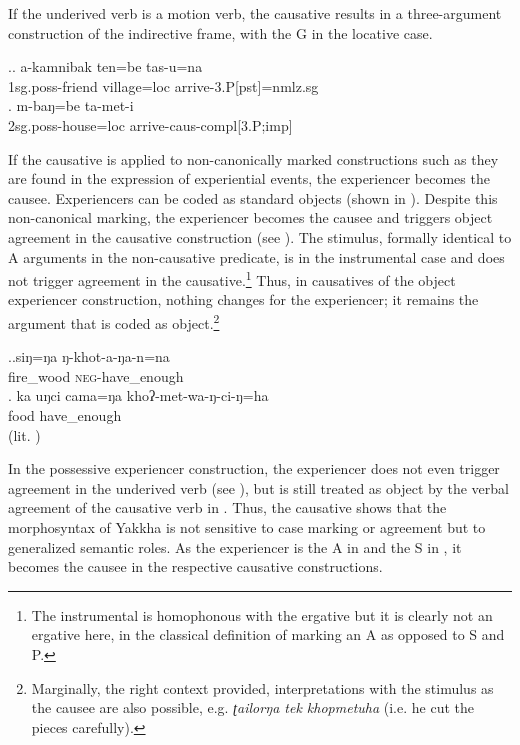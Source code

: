If the underived verb is a motion verb, the causative results in a three-argument construction of the indirective frame, with the G in the locative case.

\ex.\ag. a-kamnibak ten=be tas-u=na\\
{\sc 1sg.poss-}friend  village{\sc =loc} arrive{\sc -3.P[pst]=nmlz.sg}\\
\bg. m-baŋ=be  ta-met-i\\
{\sc 2sg.poss-}house{\sc =loc} arrive{\sc -caus-compl[3.P;imp]}\\


If the causative is applied to non-canonically marked constructions such as they are found in the expression of experiential events, the experiencer  becomes the causee. Experiencers can be coded as standard objects (shown in \Next[a]). Despite this non-canonical marking, the experiencer becomes the causee and triggers object agreement in the causative construction (see \Next[b]). The stimulus, formally identical to A arguments in the non-causative predicate, is in the instrumental case and does not trigger agreement in the causative.\footnote{The instrumental is homophonous with the ergative but it is clearly not an ergative here, in the classical definition of marking an A as opposed to S and P.} Thus, in causatives of the object experiencer construction, nothing changes for the experiencer; it remains the argument that is coded as object.\footnote{Marginally, the right context provided, interpretations with the stimulus as the causee are also possible, e.g. \emph{ʈailorŋa tek khopmetuha}  (i.e. he cut the pieces carefully).} 

\ex.\ag.siŋ=ŋa ŋ-khot-a-ŋa-n=na\\
	fire\_wood \textsc{neg}-have\_enough\\
	\bg. ka uŋci cama=ŋa khoʔ-met-wa-ŋ-ci-ŋ=ha\\
	  food	have\_enough\\
		 (lit. )

		
In the possessive experiencer construction, the experiencer does not even trigger agreement in the underived verb (see \Next[a]), but is still treated as object by the verbal agreement of the causative verb in \Next[b]. Thus, the causative shows that the morphosyntax of Yakkha is not sensitive to case marking or agreement but to generalized semantic roles. As the experiencer is the A in \Last and the S in \Next, it becomes the causee in the respective causative constructions. 


